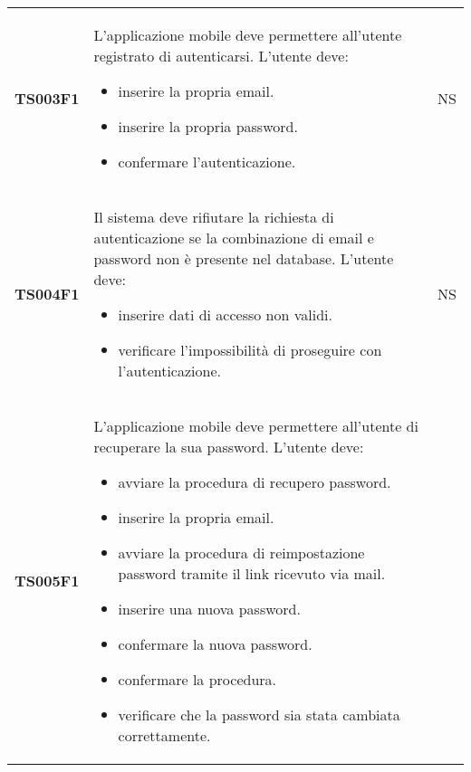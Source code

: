 \documentclass[../piano-di-qualifica.tex]{subfiles}
\begin{document}
\begin{longtable}[H]{>{\centering\bfseries}m{3cm} >{}m{10cm} >{\centering\arraybackslash}m{3cm}}
  TS003F1            & L'applicazione mobile deve permettere all'utente registrato di autenticarsi. \newline
  L'utente deve:
  \begin{itemize}
    \item inserire la propria email.
    \item inserire la propria password.
    \item confermare l'autenticazione.
  \end{itemize}
                     & NS                                                                                                                                                                                                                                                               \\
  TS004F1            & Il sistema deve rifiutare la richiesta di autenticazione se la combinazione di email e password non è presente nel database. \newline
  L'utente deve:
  \begin{itemize}
    \item inserire dati di accesso non validi.
    \item verificare l'impossibilità di proseguire con l'autenticazione.
  \end{itemize}
                     & NS                                                                                                                                                                                                                                                               \\
  TS005F1            & L'applicazione mobile deve permettere all'utente di recuperare la sua password. \newline
  L'utente deve:
  \begin{itemize}
    \item avviare la procedura di recupero password.
    \item inserire la propria email.
    \item avviare la procedura di reimpostazione password tramite il link ricevuto via mail.
    \item inserire una nuova password.
    \item confermare la nuova password.
    \item confermare la procedura.
    \item verificare che la password sia stata cambiata correttamente.
  \end{itemize}

\end{longtable}
\end{document}
